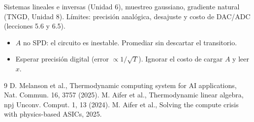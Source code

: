 \documentclass[11pt,a4paper]{article}
\begin{document}
\begin{aplicacion}
Sistemas lineales e inversas (Unidad 6), muestreo gaussiano, gradiente natural (TNGD, Unidad 8). Límites: precisión analógica, desajuste y costo de
DAC/ADC (lecciones 5.6 y 6.5).
\end{aplicacion}

\begin{error}
\begin{itemize}[nosep]
\item $A$ no SPD: el circuito es inestable. \quad Promediar sin descartar el transitorio.
\item Esperar precisión digital (error $\propto1/\sqrt T$). \quad Ignorar el costo de cargar $A$ y leer $x$.
\end{itemize}
\end{error}

\begin{thebibliography}{9}\small
{} D. Melanson et al., Thermodynamic computing system for AI applications, Nat. Commun. 16, 3757 (2025).
 M. Aifer et al., Thermodynamic linear algebra, npj Unconv. Comput. 1, 13 (2024).
 M. Aifer et al., Solving the compute crisis with physics-based ASICs, 2025.
\end{thebibliography}
\end{document}
